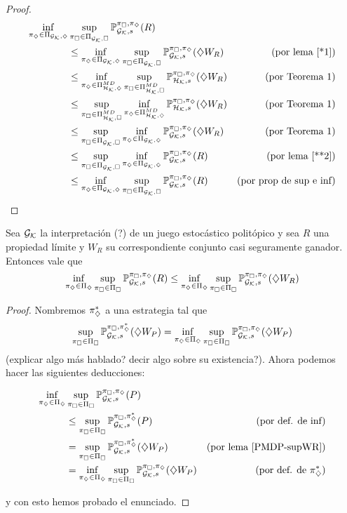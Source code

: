 \begin{proof}
	\begin{align*}
		\inf_{\piGdiam} &\sup_{\piGcuad} \ProbG(R) \\
		&\leq \inf_{\piGdiam} \sup_{\piGcuad} \ProbG(\alc W_R)
		& \text{(por lema \ref{*1})}
		\\
		&\leq \inf_{\piHdiamMD} \sup_{\piHcuadMD} \ProbH(\alc W_R)
		& \text{(por Teorema 1)}
		\\
		&\leq \sup_{\piHcuadMD} \inf_{\piHdiamMD} \ProbH(\alc W_R)
		& \text{(por Teorema 1)}
		\\
		&\leq \sup_{\piGcuad} \inf_{\piGdiam} \ProbG(\alc W_R)
		& \text{(por Teorema 1)}
		\\
		&\leq \sup_{\piGcuad} \inf_{\piGdiam} \ProbG(R)
		& \text{(por lema \ref{**2})}
		\\
		&\leq \inf_{\piGdiam} \sup_{\piGcuad} \ProbG(R)
		& \text{(por prop de sup e inf)}
	\end{align*}
\end{proof}

\begin{lemma}
	\label{*1}
	Sea $\Gk$ la interpretación (?) de un juego estocástico politópico y sea $R$ una propiedad límite y $W_R$ su correspondiente conjunto casi seguramente ganador. Entonces vale que
	$$
		\inf_{\pidiamset} \sup_{\picuadset} \ProbG (R) \leq \inf_{\pidiamset} \sup_{\picuadset} \ProbG (\alc W_R)
	$$
\end{lemma}

\begin{proof}
	Nombremos $\pidiam^*$ a una estrategia tal que $$ \sup_{\picuadset} \Prob_{\Gk, s}^{\picuad, \pidiam^*} (\alc W_P)= \inf_{\pidiamset} \sup_{\picuadset} \ProbG(\alc W_P)$$ (explicar algo más hablado? decir algo sobre su existencia?). Ahora podemos hacer las siguientes deducciones:

	\begin{align*}
		\inf_{\pidiamset} &\sup_{\picuadset} \ProbG(P) \\
		&\leq \sup_{\picuadset} \Prob_{\Gk, s}^{\picuad, \pidiam^*} (P) &\text{(por def. de inf)} \\
		&= \sup_{\picuadset} \Prob_{\Gk, s}^{\picuad, \pidiam^*} (\alc W_P) &\text{(por lema \ref{PMDP-supWR})} \\
		&= \inf_{\pidiamset} \sup_{\picuadset} \ProbG(\alc W_P) &\text{(por def. de $\pidiam^*$)}
	\end{align*}

	y con esto hemos probado el enunciado.
\end{proof}

